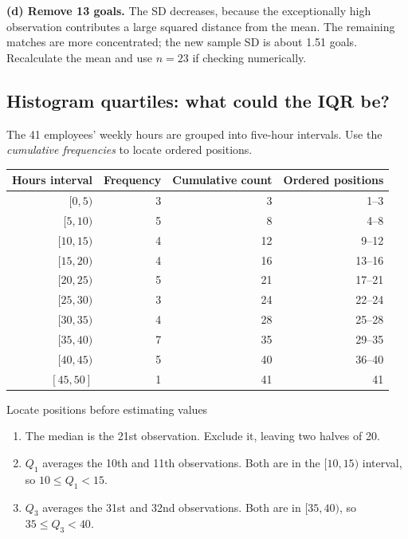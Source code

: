 \documentclass[11pt]{article}
\newcommand{\ans}[1]{\textcolor{AnswerBlue}{#1}}
\begin{document}
\textbf{(d) Remove 13 goals.} The SD \ans{decreases}, because the exceptionally high observation contributes a large squared distance from the mean. The remaining matches are more concentrated; the new sample SD is about \ans{1.51 goals}. Recalculate the mean and use $n=23$ if checking numerically.

\clearpage
\subsection{Histogram quartiles: what could the IQR be?}
\label{review:histogram}

The 41 employees' weekly hours are grouped into five-hour intervals. Use the \emph{cumulative frequencies} to locate ordered positions.

\begin{center}
\end{center}

\begin{center}
\begin{tabular}{rrrr}
\toprule
Hours interval & Frequency & Cumulative count & Ordered positions\\
\midrule
$[0,5)$ & 3 & 3 & 1--3\\
$[5,10)$ & 5 & 8 & 4--8\\
\rowcolor{Sky}$[10,15)$ & 4 & 12 & 9--12\\
$[15,20)$ & 4 & 16 & 13--16\\
$[20,25)$ & 5 & 21 & 17--21\\
$[25,30)$ & 3 & 24 & 22--24\\
$[30,35)$ & 4 & 28 & 25--28\\
\rowcolor{GoldLight}$[35,40)$ & 7 & 35 & 29--35\\
$[40,45)$ & 5 & 40 & 36--40\\
$[45,50]$ & 1 & 41 & 41\\
\bottomrule
\end{tabular}
\end{center}

\begin{bigidea}{Locate positions before estimating values}
\begin{enumerate}[label=\arabic*.]
  \item The median is the 21st observation. Exclude it, leaving two halves of 20.
  \item $Q_1$ averages the 10th and 11th observations. Both are in the $[10,15)$ interval, so $10\le Q_1<15$.
  \item $Q_3$ averages the 31st and 32nd observations. Both are in $[35,40)$, so $35\le Q_3<40$.
\end{enumerate}
\end{bigidea}
\end{document}
